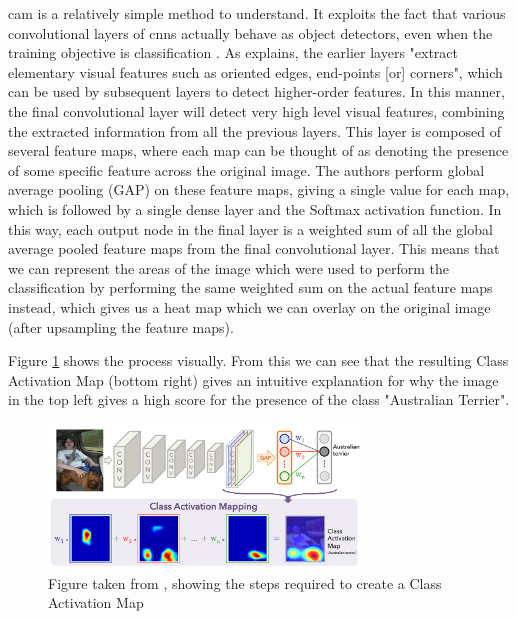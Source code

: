 \documentclass[UKenglish]{uiomasterthesis} %
\theoremstyle{definition}
\begin{document}
\ac{cam} is a relatively simple method to understand. It exploits the fact that various convolutional layers of \ac{cnn}s actually behave as object detectors, even when the training objective is classification \cite{cam}. As \cite{lenet5} explains, the earlier layers "extract elementary visual features such as oriented edges, end-points [or] corners", which can be used by subsequent layers to detect higher-order features. In this manner, the final convolutional layer will detect very high level visual features, combining the extracted information from all the previous layers. This layer is composed of several feature maps, where each map can be thought of as denoting the presence of some specific feature across the original image. The authors perform global average pooling (GAP) on these feature maps, giving a single value for each map, which is followed by a single dense layer and the Softmax activation function. In this way, each output node in the final layer is a weighted sum of all the global average pooled feature maps from the final convolutional layer. This means that we can represent the areas of the image which were used to perform the classification by performing the same weighted sum on the actual feature maps instead, which gives us a heat map which we can overlay on the original image (after upsampling the feature maps).

Figure \ref{camimg} shows the process visually. From this we can see that the resulting Class Activation Map (bottom right) gives an intuitive explanation for why the image in the top left gives a high score for the presence of the class "Australian Terrier".

\begin{figure}[h]
\centerline{\includegraphics[width=3.25in]{figure/cam.pdf}}
\caption{Figure taken from \cite{cam}, showing the steps required to create a Class Activation Map}
\label{camimg}
\end{figure}
\end{document}
